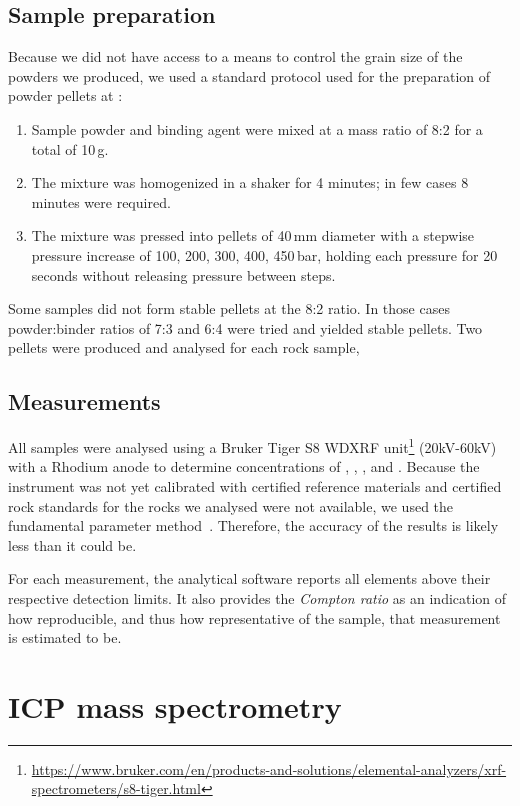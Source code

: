 \subsection{Sample preparation}
 
Because we did not have access to a means to control the grain size of the powders we produced, 
we used a standard protocol used for the preparation of powder \XRF pellets at \ETH:

\begin{enumerate}
    \item Sample powder and binding agent were mixed at a mass ratio of 8:2 for
    a total of 10\,g. 
    \item The mixture was homogenized in 
    a shaker for 4 minutes; in few cases 8 minutes were required.
    \item The mixture was pressed into pellets of 40\,mm diameter with a stepwise pressure increase  
    of 100, 200, 300, 400, 450\,bar, holding each pressure for 20 seconds without releasing pressure
    between steps.
\end{enumerate}

Some samples did not form stable pellets at the 8:2 ratio. In those cases powder:binder
ratios of 7:3 and 6:4 were tried and yielded stable pellets.
Two pellets were produced and analysed for each rock sample, 

\subsection{Measurements}

All samples were analysed using a Bruker Tiger S8 WDXRF unit\footnote{\url{https://www.bruker.com/en/products-and-solutions/elemental-analyzers/xrf-spectrometers/s8-tiger.html}}
(20kV-60kV) with a Rhodium anode to determine
concentrations of , , ,  and .
Because the instrument was not yet calibrated with certified reference materials
and certified rock standards for the rocks we analysed were not available, we used the
fundamental parameter method~\parencite{ichikawa_solid_2023}.
Therefore, the accuracy of the results is likely less than it could be. 

For each measurement, the analytical software reports all elements above their respective detection limits.
It also provides the \emph{Compton ratio} as an indication
of how reproducible, and thus how representative of the sample, that measurement is estimated to be.

\section{ICP mass spectrometry}

